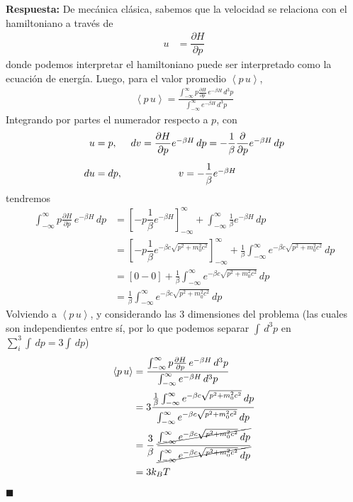 \documentclass[]{article}
\numberwithin{equation}{section}
\newcommand{\0}{\textcolor{gray}{0}}
\newcommand{\pd}[2]{\dfrac{\partial #1}{\partial #2}}
\newcommand{\spd}[2]{\frac{\partial #1}{\partial #2}}
\newcommand{\pr}[1]{\left\langle #1 \right\rangle }
\newcommand{\qed}{\hfill\(\blacksquare\)}
\begin{document}
\begin{enumerate}
	\textbf{Respuesta:} De mecánica clásica, sabemos que la velocidad se relaciona con el hamiltoniano a través de
	\begin{align}
		u &= \pd{H}{p} \nonumber%
	\end{align}
	donde podemos interpretar el hamiltoniano puede ser interpretado como la ecuación de energía. Luego, para el valor promedio $\pr{p \, u}$,
	\begin{align*}
		\pr{p \, u} = \frac{\int_{-\infty}^{\infty} p \spd{H}{p} \, e^{-\beta H} \, d^3p}{\int_{-\infty}^{\infty} e^{-\beta H} \, d^3p}
	\end{align*}
	Integrando por partes el numerador respecto a $p$, con
	\begin{equation*}
		\begin{matrix}
			u = p, & dv=\pd{H}{p} e^{-\beta H} \, dp = -\dfrac{1}{\beta}\pd{}{p} e^{-\beta H} \, dp\vspace{3mm}\\
			du = dp, & v = -\dfrac{1}{\beta} e^{-\beta H}
		\end{matrix}
	\end{equation*}
	tendremos
	\begin{align*}
		\int_{-\infty}^{\infty} p \spd{H}{p} \, e^{-\beta H} \, dp &= \left[- p \dfrac{1}{\beta} e^{-\beta H}\right]_{-\infty}^{\infty} + \int_{-\infty}^{\infty} \frac{1}{\beta} e^{-\beta H} \, dp\\
		&= \left[- p \dfrac{1}{\beta} e^{-\beta c \sqrt{p^2 + m_0^2 c^2}}\right]_{-\infty}^{\infty} + \frac{1}{\beta} \int_{-\infty}^{\infty} e^{-\beta c \sqrt{p^2 + m_0^2 c^2}} \, dp\\
		&= \left[0 - 0\right] + \frac{1}{\beta} \int_{-\infty}^{\infty} e^{-\beta c \sqrt{p^2 + m_0^2 c^2}} \, dp\\
		&= \frac{1}{\beta} \int_{-\infty}^{\infty} e^{-\beta c \sqrt{p^2 + m_0^2 c^2}} \, dp
	\end{align*}
	Volviendo a $\pr{p \, u}$, y considerando las 3 dimensiones del problema (las cuales son independientes entre sí, por lo que podemos separar $\int \, d^3 p$ en $\sum_{i}^{3} \int  \, dp = 3 \int \, dp$)
	\begin{align}
		\pr{p \, u} &= \frac{\int_{-\infty}^{\infty} p \spd{H}{p} \, e^{-\beta H} \, d^3p}{\int_{-\infty}^{\infty} e^{-\beta H} \, d^3p} \nonumber\\
		&= 3\frac{\frac{1}{\beta} \int_{-\infty}^{\infty} e^{-\beta c \sqrt{p^2 + m_0^2 c^2}} \, dp}{\int_{-\infty}^{\infty} e^{-\beta c \sqrt{p^2 + m_0^2 c^2}} \, dp} \nonumber\\
		&= \frac{3}{\beta} \, \frac{\cancel{\int_{-\infty}^{\infty} e^{-\beta c \sqrt{p^2 + m_0^2 c^2}} \, dp}}{\cancel{\int_{-\infty}^{\infty} e^{-\beta c \sqrt{p^2 + m_0^2 c^2}} \, dp}} \nonumber\\
		&= 3 k_B T
	\end{align}
	\qed
\end{enumerate}
\end{document}

